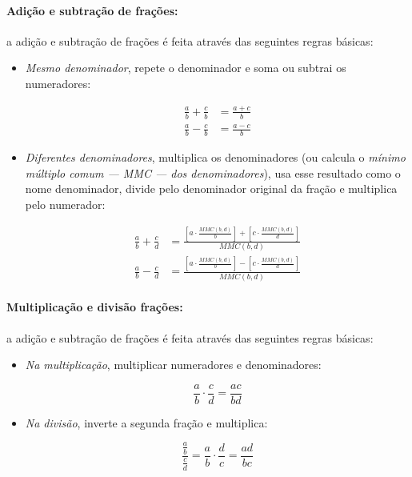 \documentclass[pdftex, brazil, 12pt, twoside]{article}
\begin{document}
\paragraph{Adição e subtração de frações:} a adição e subtração de frações é feita através
das seguintes regras básicas:

\begin{itemize}[noitemsep]
\item \emph{Mesmo denominador}, repete o denominador e soma ou subtrai os numeradores:

  \begin{equation*}
    \begin{split}
      \frac{a}{b} + \frac{c}{b} &= \frac{a+c}{b}\\
      \frac{a}{b} - \frac{c}{b} &= \frac{a-c}{b}
    \end{split}
  \end{equation*}

\item \emph{Diferentes denominadores}, multiplica os denominadores (ou calcula o \emph{mínimo
  múltiplo comum --- MMC --- dos denominadores}), usa esse resultado como o nome denominador, divide pelo denominador
  original da fração e multiplica pelo numerador:

  \begin{equation*}
    \begin{split}
      \frac{a}{b} + \frac{c}{d} &= \frac{\left[a \cdot \frac{MMC(b,d)}{b}\right] + \left[c \cdot \frac{MMC(b,d)}{d}\right]}{MMC(b,d)}\\
      \frac{a}{b} - \frac{c}{d} &= \frac{\left[a \cdot \frac{MMC(b,d)}{b}\right] - \left[c \cdot \frac{MMC(b,d)}{d}\right]}{MMC(b,d)}
    \end{split}
  \end{equation*}
\end{itemize}

\paragraph{Multiplicação e divisão frações:} a adição e subtração de frações é feita através
das seguintes regras básicas:

\begin{itemize}[noitemsep]
\item \emph{Na multiplicação}, multiplicar numeradores e denominadores:

  \begin{equation*}
      \frac{a}{b} \cdot \frac{c}{d} = \frac{ac}{bd}
  \end{equation*}

\item \emph{Na divisão}, inverte a segunda fração e multiplica:

  \begin{equation*}
      \frac{\frac{a}{b}}{\frac{c}{d}} = \frac{a}{b} \cdot \frac{d}{c} = \frac{ad}{bc}
  \end{equation*}
\end{itemize}
\end{document}
